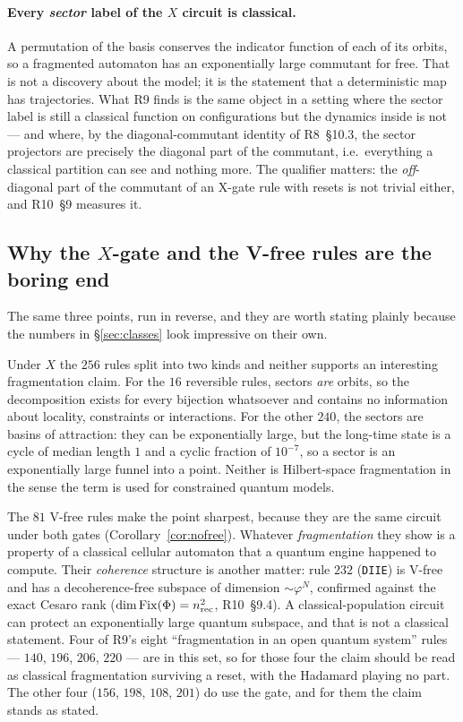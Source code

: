 \documentclass[11pt]{article}
\newcommand{\rt}[1]{\texttt{#1}}
\theoremstyle{plain}
\theoremstyle{remark}
\begin{document}
\paragraph{Every \emph{sector} label of the $X$ circuit is classical.} A
permutation of the basis conserves the indicator function of each of its orbits,
so a fragmented automaton has an exponentially large commutant for free. That is
not a discovery about the model; it is the statement that a deterministic map has
trajectories. What R9 finds is the same object in a setting where the sector label
is still a classical function on configurations but the dynamics inside is not ---
and where, by the diagonal-commutant identity of R8~\S10.3, the sector projectors
are precisely the diagonal part of the commutant, i.e.\ everything a classical
partition can see and nothing more. The qualifier matters: the \emph{off}-diagonal
part of the commutant of an X-gate rule with resets is not trivial either, and
R10~\S9 measures it.

\subsection{Why the $X$-gate and the V-free rules are the boring end}

The same three points, run in reverse, and they are worth stating plainly because
the numbers in \S\ref{sec:classes} look impressive on their own.

Under $X$ the $256$ rules split into two kinds and neither supports an interesting
fragmentation claim. For the $16$ reversible rules, sectors \emph{are} orbits,
so the decomposition exists for every bijection whatsoever and contains no
information about locality, constraints or interactions. For the other $240$, the
sectors are basins of attraction: they can be exponentially large, but the
long-time state is a cycle of median length $1$ and a cyclic fraction of
$10^{-7}$, so a sector is an exponentially large funnel into a point. Neither is
Hilbert-space fragmentation in the sense the term is used for constrained quantum
models.

The $81$ V-free rules make the point sharpest, because they are the same circuit
under both gates (Corollary~\ref{cor:nofree}). Whatever \emph{fragmentation} they
show is a property of a classical cellular automaton that a quantum engine
happened to compute. Their \emph{coherence} structure is another matter: rule
$232$ (\rt{DIIE}) is V-free and has a decoherence-free subspace of dimension
$\sim\varphi^N$, confirmed against the exact Cesaro rank
($\dim\operatorname{Fix}(\Phi)=n_{\rm rec}^2$, R10~\S9.4). A classical-population
circuit can protect an exponentially large quantum subspace, and that is not a
classical statement. Four of R9's eight ``fragmentation in an open quantum system'' rules ---
$140$, $196$, $206$, $220$ --- are in this set, so for those four the claim should
be read as classical fragmentation surviving a reset, with the Hadamard playing no
part. The other four ($156$, $198$, $108$, $201$) do use the gate, and for them
the claim stands as stated.
\end{document}
